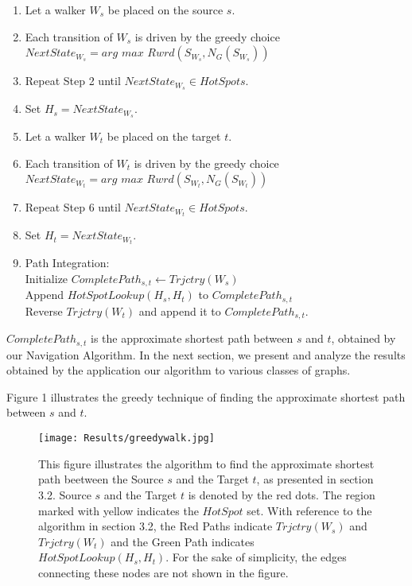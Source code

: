 \documentclass{article}
\begin{document}
\begin{enumerate}

\item Let a walker $W_s$ be placed on the source $s$. 
\item Each transition of $W_s$ is driven by the greedy choice\\
$NextState_{W_s} = arg$ $max$ $Rwrd(S_{W_s}, N_{G}(S_{W_s}))$

\item Repeat Step 2 until $NextState_{W_s} \in HotSpots$.

\item Set $H_s = NextState_{W_s}$.

\item Let a walker $W_t$ be placed on the target $t$. 
\item Each transition of $W_t$ is driven by the greedy choice\\
$NextState_{W_t} = arg$ $max$ $Rwrd(S_{W_t}, N_{G}(S_{W_t}))$

\item Repeat Step 6 until $NextState_{W_t} \in HotSpots$.

\item Set $H_t = NextState_{W_t}$.

\item Path Integration:\\
Initialize $CompletePath_{s,t} \longleftarrow Trjctry(W_s)$\\
Append $HotSpotLookup(H_s, H_t)$ to $CompletePath_{s,t}$\\
Reverse $Trjctry(W_t)$ and append it to $CompletePath_{s,t}$.

\end{enumerate} 

$CompletePath_{s,t}$ is the approximate shortest path between $s$ and $t$, obtained by our Navigation Algorithm. In the next section, we present and analyze the results obtained by the application our algorithm to various classes of graphs.

Figure 1 illustrates the greedy technique of finding the approximate shortest  path between $s$ and $t$. 

\begin{figure}[htp]
\centering
\texttt{[image: Results/greedywalk.jpg]}
\caption{This figure illustrates the algorithm to find the approximate shortest path beetween the Source $s$ and the Target $t$, as presented in section 3.2. Source $s$ and the Target $t$ is denoted by the red dots. The region marked with yellow indicates the $HotSpot$ set. With reference to the algorithm in section 3.2, the Red Paths indicate $Trjctry(W_s)$ and $Trjctry(W_t)$ and the Green Path indicates $HotSpotLookup(H_s, H_t)$. For the sake of simplicity, the edges connecting these nodes are not shown in the figure.}
\label{}
\end{figure}
\end{document}
